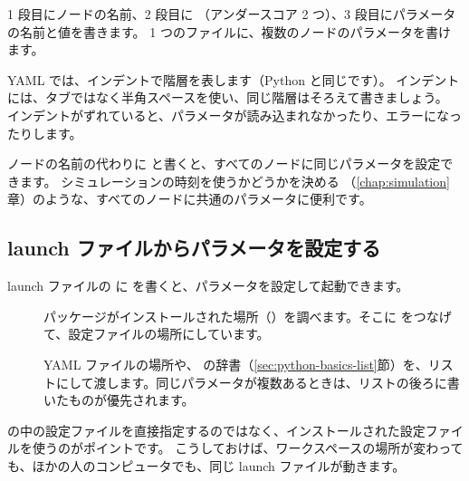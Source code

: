 
1 段目にノードの名前、2 段目に （アンダースコア 2 つ）、3 段目にパラメータの名前と値を書きます。
1 つのファイルに、複数のノードのパラメータを書けます。

\begin{caution}
  YAML では、インデントで階層を表します（Python と同じです）。
  インデントには、タブではなく半角スペースを使い、同じ階層はそろえて書きましょう。
  インデントがずれていると、パラメータが読み込まれなかったり、エラーになったりします。
\end{caution}

ノードの名前の代わりに \cmd{/**} と書くと、すべてのノードに同じパラメータを設定できます。
シミュレーションの時刻を使うかどうかを決める （\ref{chap:simulation}章）のような、すべてのノードに共通のパラメータに便利です。

\subsection{launch ファイルからパラメータを設定する}

launch ファイルの  に  を書くと、パラメータを設定して起動できます。


\begin{description}
  \item[] パッケージがインストールされた場所（\allowbreak{}）を調べます。そこに  をつなげて、設定ファイルの場所にしています。
  \item[] YAML ファイルの場所や、 の辞書（\ref{sec:python-basics-list}節）を、リストにして渡します。同じパラメータが複数あるときは、リストの後ろに書いたものが優先されます。
\end{description}

 の中の設定ファイルを直接指定するのではなく、インストールされた設定ファイルを使うのがポイントです。
こうしておけば、ワークスペースの場所が変わっても、ほかの人のコンピュータでも、同じ launch ファイルが動きます。



